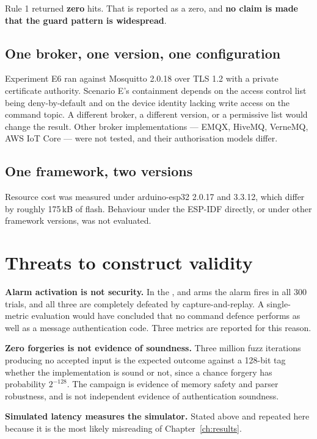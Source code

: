 Rule 1 returned \textbf{zero} hits. That is reported as a zero, and \textbf{no claim is made that
the guard pattern is widespread}.

\subsection{One broker, one version, one configuration}

Experiment E6 ran against Mosquitto 2.0.18 over TLS 1.2 with a private certificate authority.
Scenario E's containment depends on the access control list being deny-by-default and on the
device identity lacking write access on the command topic. A different broker, a different
version, or a permissive list would change the result. Other broker implementations ---
EMQX, HiveMQ, VerneMQ, AWS IoT Core --- were not tested, and their authorisation models differ.

\subsection{One framework, two versions}

Resource cost was measured under arduino-esp32 2.0.17 and 3.3.12, which differ by roughly 175\,kB
of flash. Behaviour under the ESP-IDF directly, or under other framework versions, was not
evaluated.

\section{Threats to construct validity}

\textbf{Alarm activation is not security.} In the ,  and 
arms the alarm fires in all 300 trials, and all three are completely defeated by
capture-and-replay. A single-metric evaluation would have concluded that no command defence
performs as well as a message authentication code. Three metrics are reported for this reason.

\textbf{Zero forgeries is not evidence of soundness.} Three million fuzz iterations producing no
accepted input is the expected outcome against a 128-bit tag whether the implementation is sound
or not, since a chance forgery has probability $2^{-128}$. The campaign is evidence of memory
safety and parser robustness, and is not independent evidence of authentication soundness.

\textbf{Simulated latency measures the simulator.} Stated above and repeated here because it is
the most likely misreading of Chapter~\ref{ch:results}.

